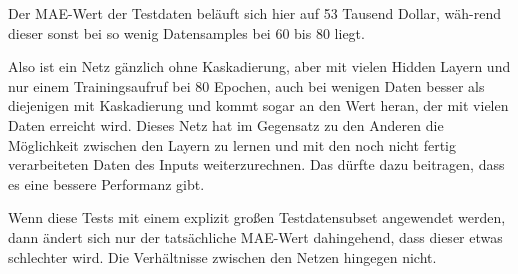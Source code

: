 Der MAE-Wert der Testdaten beläuft sich hier auf 53 Tausend Dollar, wäh-rend dieser sonst bei so wenig Datensamples bei 60 bis 80 liegt. 

Also ist ein Netz gänzlich ohne Kaskadierung, aber mit vielen Hidden Layern und nur einem Trainingsaufruf bei 80 Epochen, auch bei wenigen 
Daten besser als diejenigen mit Kaskadierung und kommt sogar an den Wert heran, der mit vielen Daten erreicht wird. 
Dieses Netz hat im Gegensatz zu den Anderen die Möglichkeit zwischen den Layern zu lernen und mit den noch nicht fertig verarbeiteten Daten 
des Inputs weiterzurechnen. Das dürfte dazu beitragen, dass es eine bessere Performanz gibt. 


Wenn diese Tests mit einem explizit großen Testdatensubset angewendet werden, dann ändert sich nur der tatsächliche MAE-Wert dahingehend, dass 
dieser etwas schlechter wird. Die Verhältnisse zwischen den Netzen hingegen nicht. 
